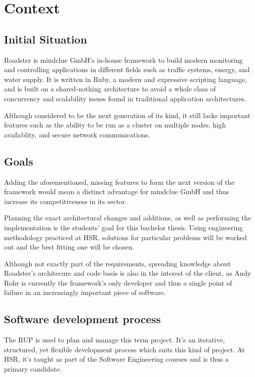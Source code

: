 \chapter{Context}
\section{Initial Situation}
Roadster is mindclue GmbH's in-house framework to build modern monitoring and
controlling applications in different fields such as traffic systems, energy,
and water supply. It is written in Ruby, a modern and expressive scripting
language, and is built on a shared-nothing architecture to avoid a whole class
of concurrency and scalability issues found in traditional application
architectures.

Although considered to be the next generation of its kind, it still lacks
important features such as the ability to be run as a cluster on multiple
nodes, high availablity, and secure network communications.

\section{Goals}
Adding the aforementioned, missing features to form the next version of the
framework would mean a distinct advantage for mindclue GmbH and thus increase
its competitiveness in its sector.

Planning the exact architectural changes and additions, as well as performing
the implementation is the students' goal for this bachelor thesis. Using
engineering methodology practiced at HSR, solutions for particular problems
will be worked out and the best fitting one will be chosen.

Although not exactly part of the requirements, spreading knowledge about Roadster's
architecure and code basis is also in the interest of the client, as Andy Rohr
is currently the framework's only developer and thus a single point of failure
in an increasingly important piece of software.

\section{Software development process}
The \gls{RUP} is used to plan and manage this term project. It’s an iterative,
structured, yet flexible development process which suits this kind of project.
At HSR, it’s taught as part of the Software Engineering courses and is thus a
primary candidate.

